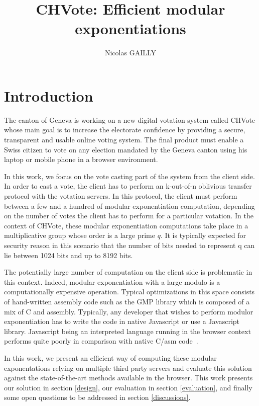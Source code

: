 \documentclass[]{article}
\title{CHVote: Efficient modular exponentiations}
\author{Nicolas GAILLY}
\begin{document}
\maketitle

\section{Introduction} \label{intro}

The canton of Geneva is working on a new digital votation system called CHVote
\cite{chvote} whose main goal is to increase the electorate confidence by
providing a secure, transparent and usable online voting system. The final
product must enable a Swiss citizen to vote on any election mandated by the
Geneva canton using his laptop or mobile phone in a browser environment.

In this work, we focus on the vote casting part of the system from the client
side. In order to cast a vote, the client has to perform an k-out-of-n oblivious
transfer protocol \cite{chu2005} with the votation servers. In this protocol,
the client must perform between a few and a hundred of modular exponentiation
computation, depending on the number of votes the client has to perform for a
particular votation. In the context of CHVote, these modular exponentiation
computations take place in a multiplicative group whose order is a large prime
$q$. It is typically expected for security reason in this scenario that the number
of bits needed to represent q can lie between 1024 bits and up to 8192 bits.

The potentially large number of computation on the client side is problematic in
this context.  Indeed, modular exponentiation with a large modulo is a
computationally expensive operation. Typical optimizations in this space
consists of hand-written assembly code such as the GMP library \cite{gmplib}
which is composed of a mix of C and assembly. Typically, any developer that wishes
to perform modulor exponentiation has to write the code in native Javascript or
use a Javascript library. Javascript being an interpreted language running in
the browser context performs quite poorly in comparison with native C/asm
code~\cite{jsbad}.

In this work, we present an efficient way of computing these modular
exponentations relying on multiple third party servers and evaluate this
solution against the state-of-the-art methods available in the browser. This
work presents our solution in section \ref{design}, our evaluation in section
\ref{evaluation}, and finally some open questions to be addressed in section
\ref{discussions}.
\end{document}

